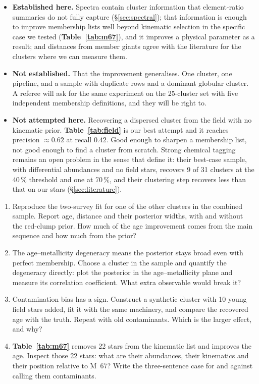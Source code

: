 \begin{itemize}
\item \textbf{Established here.} Spectra contain cluster information that
  element-ratio summaries do not fully capture (\S\ref{sec:spectral}); that
  information is enough to improve membership lists well beyond kinematic
  selection in the specific case we tested (\textbf{Table~\ref{tab:m67}}), and
  it improves a physical parameter as a result; and distances from member
  giants agree with the literature for the clusters where we can measure them.
\item \textbf{Not established.} That the improvement generalises. One cluster,
  one pipeline, and a sample with duplicate rows and a dominant globular
  cluster. A referee will ask for the same experiment on the 25-cluster set
  with five independent membership definitions, and they will be right to.
\item \textbf{Not attempted here.} Recovering a dispersed cluster from the
field with no kinematic prior. \textbf{Table~\ref{tab:field}} is our best
attempt and it reaches precision $\approx 0.62$ at recall $0.42$. Good enough
to sharpen a membership list, not good enough to find a cluster from scratch.
Strong chemical tagging remains an open problem in the sense that
\citet{Casamiquela:21} define it: their best-case sample, with differential
abundances and no field stars, recovers 9 of 31 clusters at the 40\,\%
threshold and one at 70\,\%, and their clustering step recovers less than that
on our stars (\S\ref{sec:literature}).
\end{itemize}

\begin{issues}[EXERCISES]
\begin{enumerate}
\item Reproduce the two-survey fit for one of the other clusters in the
  combined sample. Report age, distance and their posterior widths, with and
  without the red-clump prior. How much of the age improvement comes from the
  main sequence and how much from the prior?
\item The age--metallicity degeneracy means the posterior stays broad even
  with perfect membership. Choose a cluster in the sample and quantify the
  degeneracy directly: plot the posterior in the age--metallicity plane and
  measure its correlation coefficient. What extra observable would break it?
\item Contamination bias has a sign. Construct a synthetic cluster with 10%
  young field stars added, fit it with the same machinery, and compare the
  recovered age with the truth. Repeat with old contaminants. Which is the
  larger effect, and why?
\item \textbf{Table~\ref{tab:m67}} removes 22 stars from the kinematic list
  and improves the age. Inspect those 22 stars: what are their abundances,
  their kinematics and their position relative to M~67? Write the three-sentence
  case for and against calling them contaminants.
\end{enumerate}
\end{issues}
